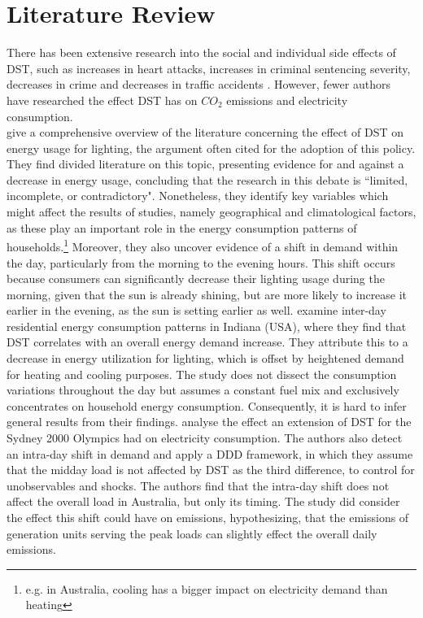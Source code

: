 \section{Literature Review}
There has been extensive research into the social and individual side effects of \ac{DST}, such as increases in heart attacks, increases in criminal sentencing severity, decreases in crime and decreases in traffic accidents \parencite{heart_attacks, sleepy_punishers, doleac_crime, bunnings_traffic}.
However, fewer authors have researched the effect \ac{DST} has on $CO_2$ emissions and electricity consumption. \\
\textcite{aries_effect_2008} give a comprehensive overview of the literature concerning the effect of \ac{DST} on energy usage for lighting, the argument often cited for the adoption of this policy. They find divided literature on this topic, presenting evidence for and against a decrease in energy usage, concluding that the research in this debate is ``limited, incomplete, or contradictory". Nonetheless, they identify key variables which might affect the results of studies, namely geographical and climatological factors, as these play an important role in the energy consumption patterns of households.\footnote{e.g. in Australia, cooling has a bigger impact on electricity demand than heating} Moreover, they also uncover evidence of a shift in demand within the day, particularly from the morning to the evening hours. This shift occurs because consumers can significantly decrease their lighting usage during the morning, given that the sun is already shining, but are more likely to increase it earlier in the evening, as the sun is setting earlier as well.
\textcite{kotchen} examine inter-day residential energy consumption patterns in Indiana (USA), where they find that \ac{DST} correlates with an overall energy demand increase. They attribute this to a decrease in energy utilization for lighting, which is offset by heightened demand for heating and cooling purposes. The study does not dissect the consumption variations throughout the day but assumes a constant fuel mix and exclusively concentrates on household energy consumption. Consequently, it is hard to infer general results from their findings.
\textcite{kellogg_daylight_2008} analyse the effect  an extension of \ac{DST} for the Sydney 2000 Olympics had on electricity consumption. The authors also detect an intra-day shift in demand and apply a \ac{DDD} framework, in which they assume that the midday load is not affected by \ac{DST} as the third difference, to control for unobservables and shocks. The authors find that the intra-day shift does not affect the overall load in Australia, but only its timing. The study did consider the effect this shift could have on emissions, hypothesizing, that the emissions of generation units serving the peak loads can slightly effect the overall daily emissions.
